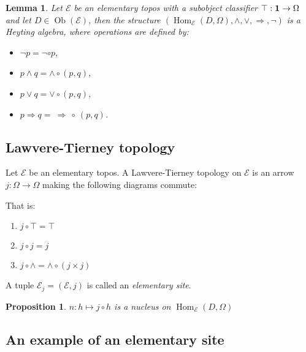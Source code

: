 \documentclass[a4paper]{article}
\theoremstyle{defin}
\theoremstyle{theorem}
\theoremstyle{claim}
\theoremstyle{prop}
\newtheorem{prop}{Proposition}
\theoremstyle{lemma}
\newtheorem{lemma}{Lemma}
\theoremstyle{fact}
\theoremstyle{ex}
\theoremstyle{col}
\begin{document}
\begin{lemma}
Let $\mathcal{E}$ be an elementary topos with a subobject classifier $\top : {\bf 1} \to \Omega$ and let $D \in \operatorname{Ob}(\mathcal{E})$, then the structure $(\operatorname{Hom}_{\mathcal{E}}(D, \Omega), \wedge, \vee, \Rightarrow, \neg)$ is a Heyting algebra, where operations are defined by:

\begin{itemize}
\item $\neg p = \neg \circ p$,
\item $p \wedge q = \wedge \circ (p, q)$,
\item $p \vee q = \vee \circ (p, q)$,
\item $p \Rightarrow q = \: \Rightarrow \: \circ \: (p, q)$.
\end{itemize}
\end{lemma}

\subsection{Lawvere-Tierney topology}

Let $\mathcal{E}$ be an elementary topos. A Lawvere-Tierney topology on $\mathcal{E}$ is an arrow $j : \Omega \to \Omega$ making the following diagrams commute:

\centerline{
}
That is:
\begin{enumerate}
\item $j \circ \top = \top$
\item $j \circ j = j$
\item $j \circ \wedge = \wedge \circ (j \times j)$
\end{enumerate}

A tuple $\mathcal{E}_j = (\mathcal{E}, j)$ is called an \emph{elementary site}.

\begin{prop}
$n : h \mapsto j \circ h$ is a nucleus on $\operatorname{Hom}_\mathcal{E}(D, \Omega)$
\end{prop}

\subsection{An example of an elementary site}
\end{document}

